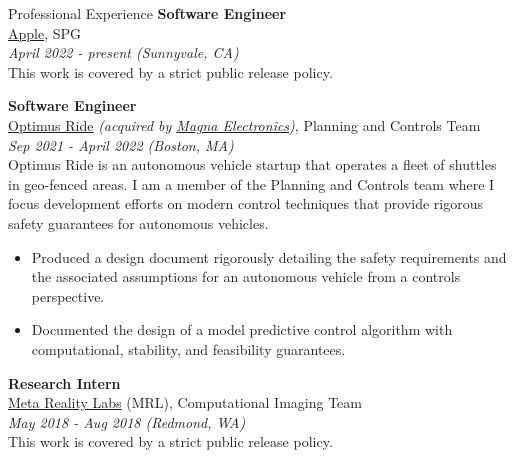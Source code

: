 \documentclass[9pt]{article}
\begin{document}
\begin{rsection}{Professional Experience}
    \textbf{Software Engineer} \\
    \href{https://www.apple.com/}{Apple}, SPG \\
    \textit{April 2022 - present (Sunnyvale, CA)}
    \vspace{0.5em} \\
    This work is covered by a strict public release policy.
    
    \textbf{Software Engineer} \\
    \href{https://www.optimusride.com/}{Optimus Ride} \textit{(acquired by \href{https://www.magna.com/company/company-information/magna-groups/magna-electronics}{Magna Electronics})}, Planning and Controls Team \\
    \textit{Sep 2021 - April 2022 (Boston, MA)}
    \vspace{0.5em} \\
    Optimus Ride is an autonomous vehicle startup that operates a fleet of shuttles in geo-fenced areas. I am a member of the Planning and Controls team where I focus development efforts on modern control techniques that provide rigorous safety guarantees for autonomous vehicles.
    \begin{itemize}
        \item Produced a design document rigorously detailing the safety requirements and the associated assumptions for an autonomous vehicle from a controls perspective.
        \item Documented the design of a model predictive control algorithm with computational, stability, and feasibility guarantees.
    \end{itemize}
    
    \textbf{Research Intern} \\
    \href{https://about.facebook.com/realitylabs/}{Meta Reality Labs} (MRL), Computational Imaging Team \\
    \textit{May 2018 - Aug 2018 (Redmond, WA)}
    \vspace{0.5em} \\
    This work is covered by a strict public release policy.
    

\end{rsection}
\end{document}

